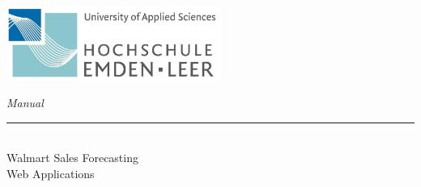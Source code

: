 %
%
%



\begin{titlepage}
    
    \begin{flushleft} 
        \includegraphics[width=7cm]{General/HSEmdenLeerLogo.png}
    \end{flushleft} 
    
    \begin{flushright}
        \vspace{0cm}
        \LARGE \textsl{Manual}\\
        \rule{0.6\textwidth}{0.4pt} ~\\
        \vspace{0.5cm}
        \textsf{\LARGE Walmart Sales Forecasting}\\
        \textsf{\LARGE Web Applications}
    \end{flushright}
    
   \vspace{0cm}
\begin{figure}[h]
	\centering
\end{figure}




\end{titlepage}
